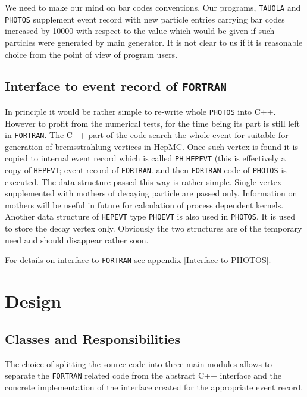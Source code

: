 \documentclass[]{Photos_interface_design}
\begin{document}
We need to make our mind on bar codes conventions. Our programs, {\tt TAUOLA} and
 {\tt PHOTOS} supplement event record with new particle entries carrying bar codes 
increased by 10000 with respect to the value which would be given if such 
particles were generated by main generator. It is not clear to us if it is 
reasonable choice from the point of view of program users.

\subsection{Interface to event record of {\tt FORTRAN}}
\label{sect:F77fill}
In principle it would be rather simple to re-write whole {\tt PHOTOS} into
C++. However to profit from the numerical tests, for the time being its part
is still left in {\tt FORTRAN}. The C++ part of the code search the whole event for
suitable for generation of bremsstrahlung vertices in HepMC. Once such
vertex is found it is copied to internal event record  which is 
called  {\tt PH$\_$HEPEVT} (this is effectively a copy of {\tt HEPEVT};
 event record of {\tt FORTRAN}.
and then {\tt FORTRAN} code of {\tt PHOTOS} is executed.
The data structure passed this way is rather simple. Single vertex
supplemented with mothers of decaying particle are passed only. Information 
on mothers will be useful in future for calculation of process dependent 
kernels. Another data structure of   {\tt HEPEVT} type {\tt PHOEVT} is also 
used in {\tt PHOTOS}. It is used to store the decay vertex only. Obviously 
the two structures are of the temporary need and should disappear rather soon.

For details on interface to {\tt FORTRAN} see appendix \ref{Interface to PHOTOS}.


\section{Design}

\subsection{Classes and Responsibilities}

The choice of splitting the source code into three main modules
allows to separate the {\tt FORTRAN} related code from the abstract C++ interface
and the concrete implementation of the interface created for the appropriate
event record.
\end{document}
